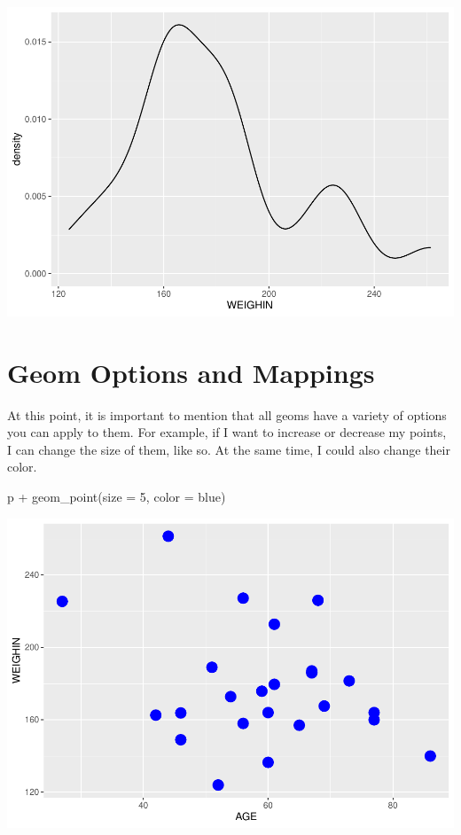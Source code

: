 \documentclass[
]{book}
\newenvironment{Shaded}{\begin{snugshade}}{\end{snugshade}}
\newcommand{\AttributeTok}[1]{\textcolor[rgb]{0.77,0.63,0.00}{#1}}
\newcommand{\DecValTok}[1]{\textcolor[rgb]{0.00,0.00,0.81}{#1}}
\newcommand{\FunctionTok}[1]{\textcolor[rgb]{0.00,0.00,0.00}{#1}}
\newcommand{\NormalTok}[1]{#1}
\newcommand{\SpecialCharTok}[1]{\textcolor[rgb]{0.00,0.00,0.00}{#1}}
\newcommand{\StringTok}[1]{\textcolor[rgb]{0.31,0.60,0.02}{#1}}
\begin{document}
\includegraphics{_main_files/figure-latex/unnamed-chunk-92-3.pdf}

\hypertarget{geom-options-and-mappings}{%
\section{Geom Options and Mappings}\label{geom-options-and-mappings}}

At this point, it is important to mention that all geoms have a variety of options you can apply to them. For example, if I want to increase or decrease my points, I can change the size of them, like so. At the same time, I could also change their color.

\begin{Shaded}
\begin{Highlighting}[]
\NormalTok{p }\SpecialCharTok{+} 
  \FunctionTok{geom\_point}\NormalTok{(}\AttributeTok{size =} \DecValTok{5}\NormalTok{, }\AttributeTok{color =} \StringTok{\textquotesingle{}blue\textquotesingle{}}\NormalTok{)}
\end{Highlighting}
\end{Shaded}

\includegraphics{_main_files/figure-latex/unnamed-chunk-93-1.pdf}
\end{document}
